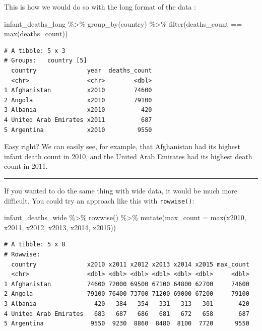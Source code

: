 \documentclass[
  letterpaper,
  DIV=11,
  numbers=noendperiod]{scrreprt}
\newenvironment{Shaded}{\begin{snugshade}}{\end{snugshade}}
\newcommand{\AttributeTok}[1]{\textcolor[rgb]{0.40,0.45,0.13}{#1}}
\newcommand{\FunctionTok}[1]{\textcolor[rgb]{0.28,0.35,0.67}{#1}}
\newcommand{\NormalTok}[1]{\textcolor[rgb]{0.00,0.23,0.31}{#1}}
\newcommand{\SpecialCharTok}[1]{\textcolor[rgb]{0.37,0.37,0.37}{#1}}
\begin{document}
This is how we would do so with the long format of the data :

\begin{Shaded}
\begin{Highlighting}[]
\NormalTok{infant\_deaths\_long }\SpecialCharTok{\%\textgreater{}\%} 
  \FunctionTok{group\_by}\NormalTok{(country) }\SpecialCharTok{\%\textgreater{}\%} 
  \FunctionTok{filter}\NormalTok{(deaths\_count }\SpecialCharTok{==} \FunctionTok{max}\NormalTok{(deaths\_count))}
\end{Highlighting}
\end{Shaded}

\begin{verbatim}
# A tibble: 5 x 3
# Groups:   country [5]
  country              year  deaths_count
  <chr>                <chr>        <dbl>
1 Afghanistan          x2010        74600
2 Angola               x2010        79100
3 Albania              x2010          420
4 United Arab Emirates x2011          687
5 Argentina            x2010         9550
\end{verbatim}

Easy right? We can easily see, for example, that Afghanistan had its
highest infant death count in 2010, and the United Arab Emirates had its
highest death count in 2011.

\begin{center}\rule{0.5\linewidth}{0.5pt}\end{center}

If you wanted to do the same thing with wide data, it would be much more
difficult. You could try an approach like this with \texttt{rowwise()}:

\begin{Shaded}
\begin{Highlighting}[]
\NormalTok{infant\_deaths\_wide }\SpecialCharTok{\%\textgreater{}\%} 
  \FunctionTok{rowwise}\NormalTok{() }\SpecialCharTok{\%\textgreater{}\%} 
  \FunctionTok{mutate}\NormalTok{(}\AttributeTok{max\_count =} \FunctionTok{max}\NormalTok{(x2010, x2011, x2012, x2013, x2014, x2015))}
\end{Highlighting}
\end{Shaded}

\begin{verbatim}
# A tibble: 5 x 8
# Rowwise: 
  country              x2010 x2011 x2012 x2013 x2014 x2015 max_count
  <chr>                <dbl> <dbl> <dbl> <dbl> <dbl> <dbl>     <dbl>
1 Afghanistan          74600 72000 69500 67100 64800 62700     74600
2 Angola               79100 76400 73700 71200 69000 67200     79100
3 Albania                420   384   354   331   313   301       420
4 United Arab Emirates   683   687   686   681   672   658       687
5 Argentina             9550  9230  8860  8480  8100  7720      9550
\end{verbatim}
\end{document}

